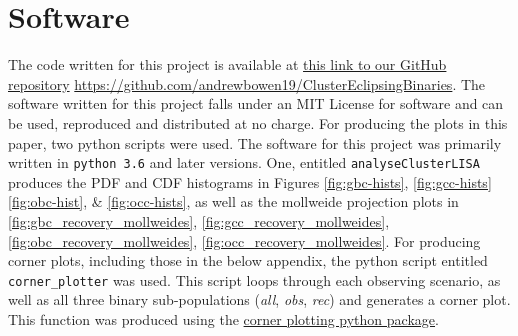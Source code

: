 \documentclass[twocolumn]{aastex63}
\begin{document}
% 
%


\nocite{*}








\appendix


\section{Software}
\label{app:Appendix A}
The code written for this project is available at \href{https://github.com/andrewbowen19/ClusterEclipsingBinaries}{this link to our GitHub repository} \url{https://github.com/andrewbowen19/ClusterEclipsingBinaries}. The software written for this project falls under an MIT License for software and can be used, reproduced and distributed at no charge. For producing the plots in this paper, two python scripts were used. The software for this project was primarily written in \texttt{python 3.6} and later versions. One, entitled \texttt{analyseClusterLISA} produces the PDF and CDF histograms in Figures \ref{fig:gbc-hists}, \ref{fig:gcc-hists} \ref{fig:obc-hist}, \& \ref{fig:occ-hists}, as well as the mollweide projection plots in \ref{fig:gbc_recovery_mollweides}, \ref{fig:gcc_recovery_mollweides}, \ref{fig:obc_recovery_mollweides}, \ref{fig:occ_recovery_mollweides}. For producing corner plots, including those in the below appendix, the python script entitled \texttt{corner\_plotter} was used. This script loops through each observing scenario, as well as all three binary sub-populations (\textit{all}, \textit{obs}, \textit{rec}) and generates a corner plot. This function was produced using the \href{https://corner.readthedocs.io/en/latest/}{corner plotting python package}.
\end{document}
